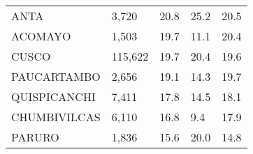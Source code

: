 \begin{tabular}{lllll}
	\cellcolor[HTML]{FF5050}ANTA                                   & 3,720                                                                 & 20.8                                                                             & 25.2                                                                        & 20.5                                                                                \\
	\cellcolor[HTML]{FF5050}ACOMAYO                                & 1,503                                                                 & 19.7                                                                             & 11.1                                                                        & 20.4                                                                                \\
	\cellcolor[HTML]{FF5050}CUSCO                                  & 115,622                                                               & 19.7                                                                             & 20.4                                                                        & 19.6                                                                                \\
	\cellcolor[HTML]{FF5050}PAUCARTAMBO                            & 2,656                                                                 & 19.1                                                                             & 14.3                                                                        & 19.7                                                                                \\
	\cellcolor[HTML]{FF5050}QUISPICANCHI                           & 7,411                                                                 & 17.8                                                                             & 14.5                                                                        & 18.1                                                                                \\
	\cellcolor[HTML]{FF5050}CHUMBIVILCAS                           & 6,110                                                                 & 16.8                                                                             & 9.4                                                                         & 17.9                                                                                \\
	\cellcolor[HTML]{FF5050}PARURO                                 & 1,836                                                                 & 15.6                                                                             & 20.0                                                                        & 14.8                                                                                \\

\end{tabular}
